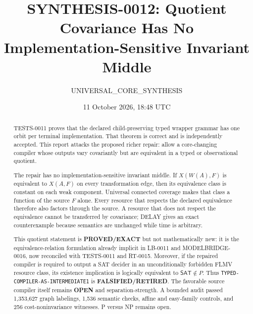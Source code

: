 \documentclass[11pt]{article}
\title{SYNTHESIS-0012: Quotient Covariance Has No Implementation-Sensitive Invariant Middle}
\author{UNIVERSAL\_CORE\_SYNTHESIS}
\date{11 October 2026, 18:48 UTC}
\newcommand{\SAT}{\mathsf{SAT}}
\newcommand{\EXACT}{\textbf{PROVED/EXACT}}
\newcommand{\OPEN}{\textbf{OPEN}}
\newcommand{\RETIRED}{\textbf{FALSIFIED/RETIRED}}
\begin{document}
\maketitle

\begin{abstract}
TESTS-0011 proves that the declared child-preserving typed wrapper grammar
has one orbit per terminal implementation.  That theorem is correct and is
independently accepted.  This report attacks the proposed richer repair:
allow a core-changing compiler whose outputs vary covariantly but are
equivalent in a typed or observational quotient.

The repair has no implementation-sensitive invariant middle.  If
\(X(W(A),F)\) is equivalent to \(X(A,F)\) on every transformation edge,
then its equivalence class is constant on each weak component.  Universal
connected coverage makes that class a function of the source \(F\) alone.
Every resource that respects the declared equivalence therefore also factors
through the source.  A resource that does not respect the equivalence cannot
be transferred by covariance; DELAY gives an exact counterexample because
semantics are unchanged while time is arbitrary.

This quotient statement is \EXACT{} but not mathematically new: it is the
equivalence-relation formulation already implicit in LB-0011 and
MODELBRIDGE-0016, now reconciled with TESTS-0011 and RT-0015.  Moreover,
if the repaired compiler is required to output a SAT decider in an
unconditionally forbidden FLMV resource class, its existence implication is
logically equivalent to \(\SAT\notin P\).  Thus
\texttt{TYPED-COMPILER-AS-INTERMEDIATE1} is \RETIRED.  The favorable
source compiler itself remains \OPEN{} and separation-strength.  A bounded
audit passed 1,353,627 graph labelings, 1,536 semantic checks, affine and
easy-family controls, and 256 cost-noninvariance witnesses.  P versus NP
remains open.
\end{abstract}
\end{document}
